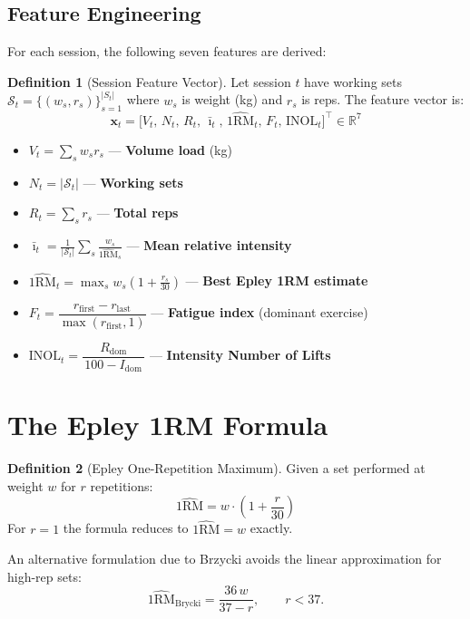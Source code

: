 \documentclass[12pt,a4paper]{report}
\newcommand{\R}{\mathbb{R}}
\newcommand{\vect}[1]{\bm{#1}}
\theoremstyle{definition}
\newtheorem{definition}{Definition}[chapter]
\begin{document}
\subsection{Feature Engineering}

For each session, the following seven features are derived:

\begin{definition}[Session Feature Vector]
Let session $t$ have working sets $\mathcal{S}_t = \{(w_s, r_s)\}_{s=1}^{|S_t|}$
where $w_s$ is weight (kg) and $r_s$ is reps. The feature vector is:
\[
  \vect{x}_t = \bigl[V_t,\, N_t,\, R_t,\, \bar{\imath}_t,\, \widehat{1\text{RM}}_t,\, F_t,\, \text{INOL}_t\bigr]^\top \in \R^7
\]
\end{definition}

\begin{itemize}
  \item $V_t = \sum_s w_s r_s$ — \textbf{Volume load} (kg)
  \item $N_t = |\mathcal{S}_t|$ — \textbf{Working sets}
  \item $R_t = \sum_s r_s$ — \textbf{Total reps}
  \item $\bar{\imath}_t = \frac{1}{|\mathcal{S}_t|}\sum_s \frac{w_s}{\widehat{1\text{RM}}_s}$ — \textbf{Mean relative intensity}
  \item $\widehat{1\text{RM}}_t = \max_s w_s\!\left(1 + \tfrac{r_s}{30}\right)$ — \textbf{Best Epley 1RM estimate}
  \item $F_t = \dfrac{r_{\text{first}} - r_{\text{last}}}{\max(r_{\text{first}}, 1)}$ — \textbf{Fatigue index} (dominant exercise)
  \item $\text{INOL}_t = \dfrac{R_{\text{dom}}}{\,100 - I_{\text{dom}}\,}$ — \textbf{Intensity Number of Lifts}
\end{itemize}

\section{The Epley 1RM Formula}

\begin{definition}[Epley One-Repetition Maximum]
Given a set performed at weight $w$ for $r$ repetitions:
\[
  \widehat{1\text{RM}} = w \cdot \left(1 + \frac{r}{30}\right)
\]
For $r = 1$ the formula reduces to $\widehat{1\text{RM}} = w$ exactly.
\end{definition}

An alternative formulation due to Brzycki avoids the linear approximation for
high-rep sets:
\[
  \widehat{1\text{RM}}_{\text{Brycki}} = \frac{36\,w}{37 - r}, \qquad r < 37.
\]
\end{document}
